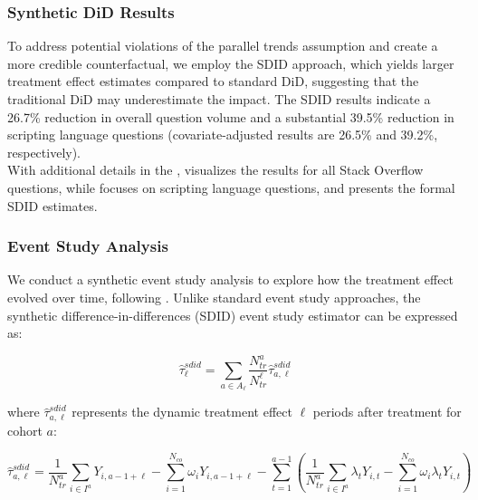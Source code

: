 
\subsubsection{Synthetic DiD Results}
To address potential violations of the parallel trends assumption and create a more credible counterfactual, we employ the SDID approach, which yields larger treatment effect estimates compared to standard DiD, suggesting that the traditional DiD may underestimate the impact. The SDID results indicate a 26.7\% reduction in overall question volume and a substantial 39.5\% reduction in scripting language questions (covariate-adjusted results are 26.5\% and 39.2\%, respectively).\\

With additional details in the ,  visualizes the results for all Stack Overflow questions, while  focuses on scripting language questions, and  presents the formal SDID estimates.


\subsubsection{Event Study Analysis}
We conduct a synthetic event study analysis to explore how the treatment effect evolved over time, following \textcite{ciccia_short_2024}. Unlike standard event study approaches, the synthetic difference-in-differences (SDID) event study estimator can be expressed as:

\begin{equation}
    \hat{\tau}^{sdid}_{\ell} = \sum_{a \in A_{\ell}} \frac{N^a_{tr}}{N^{\ell}_{tr}} \hat{\tau}^{sdid}_{a,\ell}
\end{equation}

where $\hat{\tau}^{sdid}_{a,\ell}$ represents the dynamic treatment effect $\ell$ periods after treatment for cohort $a$:

\begin{equation}
    \hat{\tau}^{sdid}_{a,\ell} = \frac{1}{N^a_{tr}} \sum_{i \in I^a} Y_{i,a-1+\ell} - \sum_{i=1}^{N_{co}} \omega_i Y_{i,a-1+\ell} - \sum_{t=1}^{a-1} \left( \frac{1}{N^a_{tr}} \sum_{i \in I^a} \lambda_t Y_{i,t} - \sum_{i=1}^{N_{co}} \omega_i \lambda_t Y_{i,t} \right)
\end{equation}


